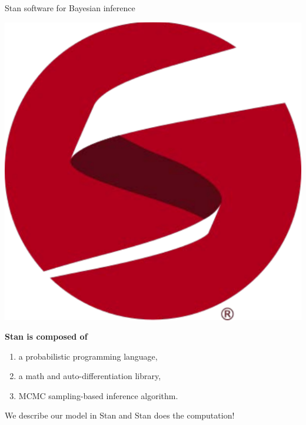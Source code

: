 \begin{frame}{Stan software for Bayesian inference}

\bigskip

\begin{center}
\includegraphics[scale=0.3]{../LectureAssets/L03/stan_logo}
\end{center}

\bigskip

\bigskip

\textbf{Stan is composed of}

\begin{enumerate}
\item a probabilistic programming language,
\item a math and auto-differentiation library,
\item MCMC sampling-based inference algorithm.
\end{enumerate}

\bigskip

We describe our model in Stan and Stan does the computation!

\bigskip

\bigskip

\end{frame}


